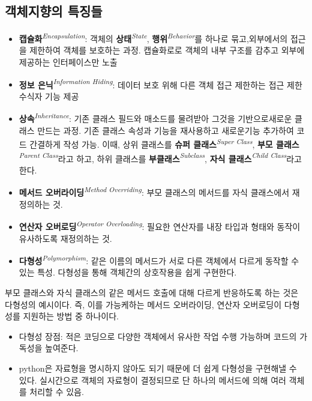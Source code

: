 \subsection{객체지향의 특징들}

\begin{itemize}
\item \textbf{캡슐화}\textit{\textsuperscript{Encapsulation}}: 객체의 \textbf{상태}\textit{\textsuperscript{State}}, \textbf{행위}\textit{\textsuperscript{Behavior}}를 하나로 묶고,외부에서의 접근을 제한하여 객체를 보호하는 과정. 캡슐화로로 객체의 내부 구조를 감추고 외부에 제공하는 인터페이스만 노출
\item \textbf{정보 은닉}\textit{\textsuperscript{Information Hiding}}: 데이터 보호 위해 다른 객체 접근 제한하는 접근 제한 수식자 기능 제공
\item \textbf{상속}\textit{\textsuperscript{Inheritance}}: 기존 클래스 필드와 매소드를 물려받아 그것을 기반으로새로운 클래스 만드는 과정. 기존 클래스 속성과 기능을 재사용하고 새로운기능 추가하여 코드 간결하게 작성 가능. 이때, 상위 클래스를 \textbf{슈퍼 클래스}\textit{\textsuperscript{Super Class}}, \textbf{부모 클래스}\textit{\textsuperscript{Parent Class}}라고 하고, 하위 클래스를 \textbf{부클래스}\textit{\textsuperscript{Subclass}}, \textbf{자식 클래스}\textit{\textsuperscript{Child Class}}라고 한다.
\item \textbf{메서드 오버라이딩}\textit{\textsuperscript{Method Overriding}}: 부모 클래스의 메서드를 자식 클래스에서 재정의하는 것.
\item \textbf{연산자 오버로딩}\textit{\textsuperscript{Operator Overloading}}: 필요한 연산자를 내장 타입과 형태와 동작이 유사하도록 재정의하는 것.
\item \textbf{다형성}\textit{\textsuperscript{Polymorphism}}: 같은 이름의 메서드가 서로 다른 객체에서 다르게 동작할 수 있는 특성. 다형성을 통해 객체간의 상호작용을 쉽게 구현한다.
\end{itemize}

부모 클래스와 자식 클래스의 같은 메서드 호출에 대해 다르게 반응하도록 하는 것은 다형성의 예시이다. 즉, 이를 가능케하는 메서드 오버라이딩, 연산자 오버로딩이 다형성를 지원하는 방법 중 하나이다.
\begin{itemize}
\item 다형성 장점: 적은 코딩으로 다양한 객체에서 유사한 작업 수행 가능하며 코드의 가독성을 높여준다.
\item python은 자료형을 명시하지 않아도 되기 때문에 더 쉽게 다형성을 구현해낼 수 있다. 실시간으로 객체의 자료형이 결정되므로 단 하나의 메서드에 의해 여러 객체를 처리할 수 있음.
\end{itemize}

